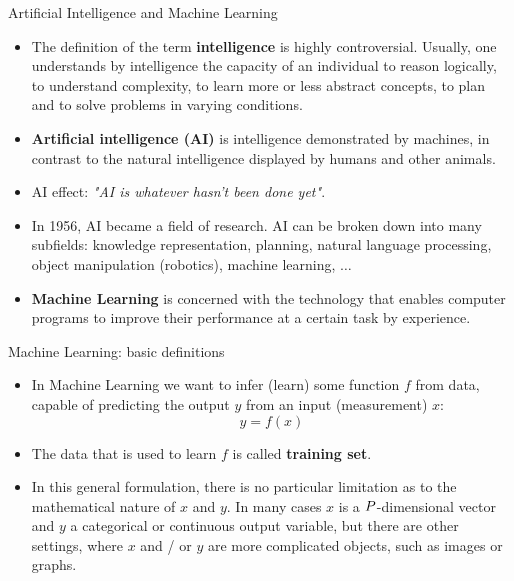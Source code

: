 \documentclass[xcolor=pdftex,dvipsnames,table]{beamer}
\begin{document}
\begin{frame}{Artificial Intelligence and Machine Learning}
\begin{itemize}
	\item The definition of the term \textbf{intelligence} is highly controversial. Usually, one understands by intelligence the capacity of an individual to reason logically, to understand complexity, to learn more or less abstract concepts, to plan and to solve problems in varying conditions.
	\item \textbf{Artificial intelligence (AI)} is intelligence demonstrated by machines, in contrast to the natural intelligence displayed by humans and other animals.
	\item AI effect: \emph{"AI is whatever hasn't been done yet"}.
	\item In 1956, AI became a field of research. AI can be broken down into many subfields: knowledge representation, planning, natural language processing, object manipulation (robotics), machine learning, $\ldots$
	\item \textbf{Machine Learning} is concerned with the technology that enables computer programs to improve their performance at a certain task by experience.
\end{itemize}
\end{frame}



\begin{frame}{Machine Learning: basic definitions}
\begin{itemize}
	\item In Machine Learning we want to infer (learn) some function $f$ from data, capable of predicting the output $y$ from an input (measurement) $x$:
	\begin{equation}
	y = f(x)
	\end{equation}
	\item The data that is used to learn $f$ is called \textbf{training set}.
	\item In this general formulation, there is no particular limitation as to the mathematical nature of $x$ and $y$. In many cases $x$ is a $P$-dimensional vector and $y$ a categorical or continuous output variable, but there are other settings, where $x$ and / or $y$ are more complicated objects, such as images or graphs.
\end{itemize}
\end{frame}
\end{document}
